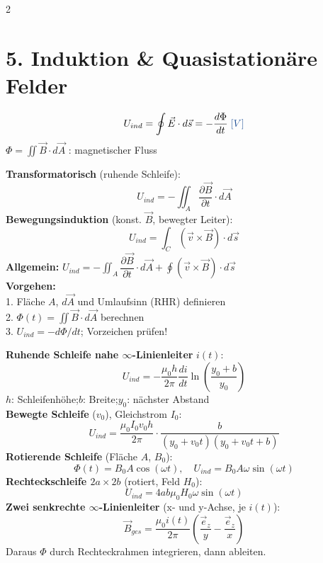 \documentclass[a4paper, 7.5pt]{extarticle}
\begin{document}
\begin{multicols*}{2}
\section*{5. Induktion \& Quasistationäre Felder}

\begin{tcolorbox}[title={Faradaysches Induktionsgesetz}]
$$U_{ind} = \oint\vec{E}\cdot d\vec{s} = -\frac{d\Phi}{dt} \;\text{\textcolor{boxtitle}{[\(V\)]}}$$
$\Phi = \iint\vec{B}\cdot d\vec{A}$ \;\text{\textcolor{boxtitle}{[\(Wb = Vs\)]}}: magnetischer Fluss\\[4pt]
\begin{center}
\end{center}
\textbf{Transformatorisch} (ruhende Schleife):
$$U_{ind} = -\iint_A\frac{\partial\vec{B}}{\partial t}\cdot d\vec{A}$$
\textbf{Bewegungsinduktion} (konst. $\vec{B}$, bewegter Leiter):
$$U_{ind} = \int_C(\vec{v}\times\vec{B})\cdot d\vec{s}$$
\textbf{Allgemein:} $U_{ind} = -\iint_A\dfrac{\partial\vec{B}}{\partial t}\cdot d\vec{A} + \oint(\vec{v}\times\vec{B})\cdot d\vec{s}$\\[3pt]
\textbf{Vorgehen:}\\
1. Fläche $A$, $d\vec{A}$ und Umlaufsinn (RHR) definieren\\
2. $\Phi(t) = \iint\vec{B}\cdot d\vec{A}$ berechnen\\
3. $U_{ind} = -d\Phi/dt$; Vorzeichen prüfen!
\end{tcolorbox}

\begin{tcolorbox}[title={Induktionsspannungen typischer Aufgaben}]
\textbf{Ruhende Schleife nahe $\infty$-Linienleiter} $i(t)$:
$$U_{ind} = -\frac{\mu_0 h}{2\pi}\frac{di}{dt}\ln\!\left(\frac{y_0+b}{y_0}\right)$$
$h$: Schleifenhöhe;\quad $b$: Breite;\quad $y_0$: nächster Abstand\\[2pt]
\textbf{Bewegte Schleife} ($v_0$), Gleichstrom $I_0$:
$$U_{ind} = \frac{\mu_0 I_0 v_0 h}{2\pi}\cdot\frac{b}{(y_0+v_0t)(y_0+v_0t+b)}$$
\textbf{Rotierende Schleife} (Fläche $A$, $B_0$):
$$\Phi(t) = B_0 A\cos(\omega t),\quad U_{ind} = B_0 A\omega\sin(\omega t)$$
\textbf{Rechteckschleife $2a\times2b$} (rotiert, Feld $H_0$):
$$U_{ind} = 4ab\mu_0 H_0\omega\sin(\omega t)$$
\textbf{Zwei senkrechte $\infty$-Linienleiter} (x- und y-Achse, je $i(t)$):
$$\vec{B}_{ges} = \frac{\mu_0 i(t)}{2\pi}\!\left(\frac{\vec{e}_z}{y} - \frac{\vec{e}_z}{x}\right)$$
Daraus $\Phi$ durch Rechteckrahmen integrieren, dann ableiten.
\end{tcolorbox}


\end{multicols*}
\end{document}
